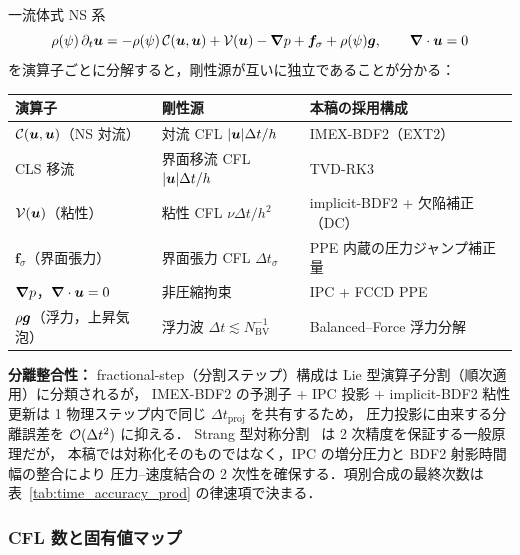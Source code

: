 一流体式 NS 系
\[
  \rho(\psi)\,\partial_t\bm{u}
    = -\rho(\psi)\,\mathcal{C}(\bm{u},\bm{u})
    + \mathcal{V}(\bm{u}) - \bm{\nabla} p + \bm{f}_\sigma + \rho(\psi)\bm{g},
  \qquad \bm{\nabla}\cdot\bm{u} = 0
\]
を演算子ごとに分解すると，剛性源が互いに独立であることが分かる：

\begin{center}
\renewcommand{\arraystretch}{\PaperTableArrayStretch}
\begin{tabular}{lll}
\hline
演算子 & 剛性源 & 本稿の採用構成 \\
\hline
$\mathcal{C}(\bm{u},\bm{u})$（NS 対流） & 対流 CFL $|\bm{u}|\Delta t/h$ & IMEX-BDF2（EXT2） \\
CLS 移流 & 界面移流 CFL $|\bm{u}|\Delta t/h$ & TVD-RK3 \\
$\mathcal{V}(\bm{u})$（粘性） & 粘性 CFL $\nu\Delta t/h^2$ & implicit-BDF2 + 欠陥補正（DC） \\
$\bm{f}_\sigma$（界面張力） & 界面張力 CFL $\Delta t_\sigma$ & PPE 内蔵の圧力ジャンプ補正量 \\
$\bm{\nabla} p$，$\bm{\nabla}\cdot\bm{u}=0$ & 非圧縮拘束 & IPC + FCCD PPE \\
$\rho\bm{g}$（浮力，上昇気泡） & 浮力波 $\Delta t \lesssim N_{\mathrm{BV}}^{-1}$ & Balanced--Force 浮力分解 \\
\hline
\end{tabular}
\end{center}

\noindent\textbf{分離整合性：}
fractional-step（分割ステップ）構成は Lie 型演算子分割（順次適用）に分類されるが，
IMEX-BDF2 の予測子 + IPC 投影 + implicit-BDF2 粘性更新は
1 物理ステップ内で同じ $\Delta t_{\mathrm{proj}}$ を共有するため，
圧力投影に由来する分離誤差を $\mathcal{O}(\Delta t^2)$ に抑える．
Strang 型対称分割~\cite{Strang1968} は 2 次精度を保証する一般原理だが，
本稿では対称化そのものではなく，IPC の増分圧力と BDF2 射影時間幅の整合により
圧力--速度結合の 2 次性を確保する．項別合成の最終次数は
表~\ref{tab:time_accuracy_prod} の律速項で決まる．

\subsubsection*{CFL 数と固有値マップ}
\label{sec:cfl_definitions}


